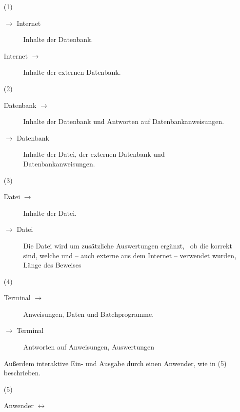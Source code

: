 \begin{itemize}
	\newcommand*{\vonnach}[2]{#1 $\rightarrow$ #2}
	\newcommand*{\nachvon}[2]{\vonnach{#2}{#1}}
	\newcommand*{\hinundher}[2]{#1 $\leftrightarrow$ #2}
	\item[(1)]\label{dat:Internet}
	\begin{description}
		\item[\vonnach{\ASBA}{Internet}]\label{dat:ausInternet}
		Inhalte der Datenbank.
		\item[\nachvon{\ASBA}{Internet}]\label{dat:inInternet}
		Inhalte der externen Datenbank.
	\end{description}
	\item[(2)]\label{dat:Datenbank}
	\begin{description}
		\item[\vonnach{Datenbank}{\ASBA}]\label{dat:ausDatenbank}
		Inhalte der Datenbank und Antworten auf Datenbankanweisungen.
		\item[\nachvon{Datenbank}{\ASBA}]\label{dat:inDatenbank}
		Inhalte der Datei, der externen Datenbank und Datenbankanweisungen.
	\end{description}
	\item[(3)]\label{dat:Datei}
	\begin{description}
		\item[\vonnach{Datei}{\ASBA}]\label{dat:ausDatei}
		Inhalte der Datei.
		\item[\nachvon{Datei}{\ASBA}]\label{dat:inDatei}
		Die Datei wird um zusätzliche Auswertungen ergänzt, \textzB\ ob die  korrekt sind, welche  und  -- auch externe aus dem Internet -- verwendet wurden, Länge des Beweises \textusw
	\end{description}
	\item[(4)]\label{dat:Terminal}
	\begin{description}
		\item[\vonnach{Terminal}{\ASBA}]\label{dat:ausTerminal}
		Anweisungen, Daten und Batchprogramme.
		\item[\nachvon{Terminal}{\ASBA}]\label{dat:inTerminal}
		Antworten auf Anweisungen, Auswertungen \textusw
	\end{description}
	Außerdem interaktive Ein- und Ausgabe durch einen Anwender, wie in (5) beschrieben.
	\item[(5)]\label{dat:Anwender}
	\begin{description}
		\item[\hinundher{Anwender}{\ASBA}]\label{dat:mitAnwender}

\end{description}
\end{itemize}
